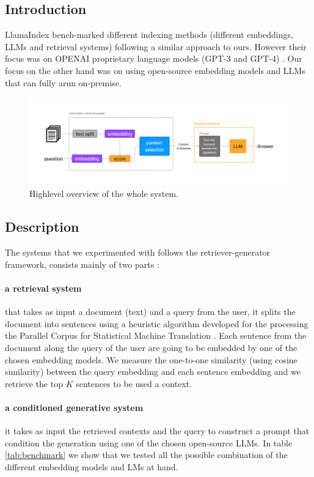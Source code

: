 \documentclass[a4paper,12pt]{article}
\begin{document}
\subsection{Introduction}
LlamaIndex \cite{Liu_LlamaIndex_2022} bench-marked different indexing methods (different embeddings, LLMs and retrieval systems) following a similar approach to ours. However their focus was on OPENAI proprietary language models (GPT-3 and GPT-4) \cite{gpt3, gpt4}.
Our focus on the other hand was on using open-source embedding models and LLMs that can fully arun on-premise.

\begin{figure}[htbp]
\centering
\includegraphics[width=.9\linewidth]{figures/full.png}
\caption{Highlevel overview of the whole system.}
\label{fig:overview}
\end{figure}

\subsection{Description}
The systems that we experimented with follows the retriever-generator framework, consists mainly of two parts : 

\paragraph{a retrieval system} that takes as input a document (text) and a query from the user, it splits the document into sentences using a heuristic algorithm developed for the processing the Parallel Corpus for Statistical Machine Translation \cite{europarl}. Each sentence from the document along the query of the user are going to be embedded by one of the chosen embedding models. We measure the one-to-one similarity (using cosine similarity) between the query embedding and each sentence embedding and we retrieve the top $K$ sentences to be used a context.

\paragraph{a conditioned generative system} it takes as input the retrieved contexts and the query to construct a prompt that condition the generation using one of the chosen open-source LLMs.
In table \ref{tab:benchmark} we show that we tested all the possible combination of the different embedding models and LMs at hand.
\end{document}
